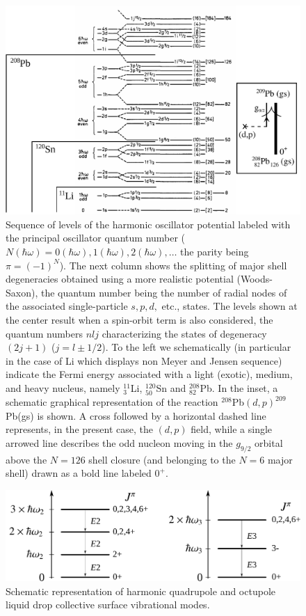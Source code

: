 \begin{figure}
	\centerline {
		\includegraphics*[width=12cm]{introduccion/figs/figpreface3}
	}
	\caption{Sequence of levels of the harmonic oscillator potential labeled with the principal oscillator quantum number ($N(\hbar\omega)=0(\hbar\omega),1 (\hbar\omega), 2(\hbar\omega),\dots$ the parity being $\pi=(-1)^N$). The next column shows the splitting of major shell degeneracies obtained using a more realistic potential (Woods-Saxon), the quantum number being the number of radial nodes of the associated single-particle $s,p,d,$ etc., states. The levels shown at the center result when a spin-orbit term is also considered, the quantum numbers $nlj$ characterizing the states of degeneracy $(2j+1)$ ($j=l\pm1/2$). To the left we schematically (in particular in the case of Li which displays non Meyer and Jensen sequence) indicate the Fermi energy associated with a light (exotic), medium, and heavy nucleus, namely $^{11}_3$Li, $^{120}_{50}$Sn and $^{208}_{82}$Pb. In the inset, a schematic graphical representation of the reaction $^{208}$Pb$(d,p)^{209}$Pb(gs) is shown. A cross followed by a horizontal dashed line represents, in the present case,  the $(d,p)$ field, while a  single arrowed line describes the odd nucleon moving in the $g_{9/2}$ orbital above the $N=126$ shell closure (and belonging to the $N=6$ major shell) drawn as a bold line labeled $0^+$.}
	\label{fig1.0.3}
\end{figure}
\begin{figure}
	\centerline {
		\includegraphics*[width=12cm]{introduccion/figs/fig1_1_4}
	}
	\caption{Schematic representation of harmonic quadrupole and octupole liquid drop collective surface vibrational modes.}
	\label{fig1.0.4}
\end{figure}

